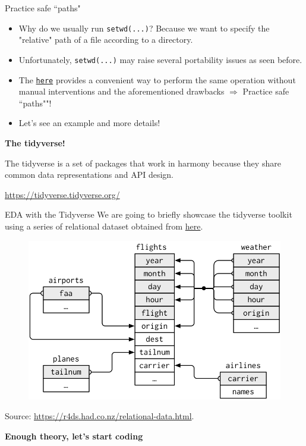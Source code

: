 \documentclass[
hyperref={bookmarks=false},
xcolor={dvipsnames,svgnames*,x11names*}, 
12pt
]{beamer}
\begin{document}
\begin{frame}{Practice safe ``paths"}
\vspace{-0.5cm}
\begin{itemize}
\itemsep 3ex
\item Why do we usually run \texttt{setwd(...)}? Because we want to specify the "relative" path of a file according to a directory. 
\item Unfortunately, \texttt{setwd(...)} may raise several portability issues as seen before. 
\item The \href{https://here.r-lib.org/}{\texttt{here}}  provides a convenient way to perform the same operation without manual interventions and the aforementioned drawbacks $\Longrightarrow$ Practice safe ``paths""! 
\item Let's see an example and more details!
\end{itemize}
\end{frame}

\begin{frame}
\vspace{2cm}
\begin{center}
\Huge
\textbf{The tidyverse!}
\end{center}
\vspace{1.5cm}
\epigraph{The tidyverse is a set of packages that work in harmony because they share common data representations and API design.}{\url{https://tidyverse.tidyverse.org/}}
\end{frame}

\begin{frame}{EDA with the Tidyverse}
\vspace{-0.5cm}
We are going to briefly showcase the tidyverse toolkit using a series of relational dataset obtained from \href{https://www.data.gov.uk/dataset/cb7ae6f0-4be6-4935-9277-47e5ce24a11f/road-safety-data}{here}.
\begin{figure}
\centering
\includegraphics[width=0.8\linewidth]{figures/relational-nycflights.png}
\end{figure}
{\small Source: \url{https://r4ds.had.co.nz/relational-data.html}.}
\end{frame}

\begin{frame}
\vspace{2cm}
\begin{center}
\Huge
\textbf{Enough theory, let's start coding }
\end{center}
\end{frame}
\end{document}
